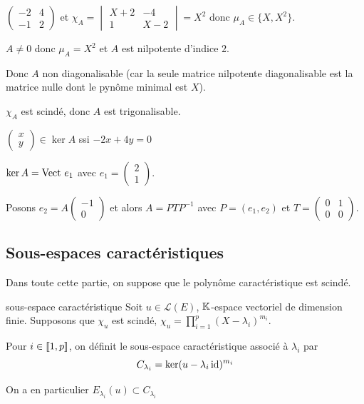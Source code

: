 \begin{exemple}
    $\begin{pmatrix}
        -2 & 4 \\ 
        -1 & 2
    \end{pmatrix}$ et $\chi_A = \begin{vmatrix}
        X + 2 & -4 \\
        1 & X - 2
    \end{vmatrix} = X^2$ donc $\mu_A \in \{X, X^2\}$.

    $A \neq 0$ donc $\mu_A = X^2$ et $A$ est nilpotente d'indice $2$.

    Donc $A$ non diagonalisable (car la seule matrice nilpotente diagonalisable 
    est la matrice nulle dont le pynôme minimal est $X$).

    $\chi_A$ est scindé, donc $A$ est trigonalisable. 

    $\begin{pmatrix}
        x \\ y
    \end{pmatrix} \in \ker A$ ssi $-2x + 4y = 0$

    $\ker A = \operatorname{Vect} \, e_1$ avec $e_1 = \begin{pmatrix}
        2 \\ 1
    \end{pmatrix}$.

    Posons $e_2 = A \begin{pmatrix}
        -1 \\ 0
    \end{pmatrix}$ et alors $A = PTP^{-1}$ avec $P = (e_1, e_2)$ et 
    $T = \begin{pmatrix}
        0 & 1 \\
        0 & 0
    \end{pmatrix}$.
\end{exemple}


\subsection{Sous-espaces caractéristiques}

Dans toute cette partie, on suppose que le polynôme caractéristique est scindé.

\begin{definition}{sous-espace caractéristique}{}
    Soit $u \in \mathscr L(E)$, $\mathbb{K}$-espace vectoriel de dimension finie. Supposons
    que $\chi_u$ est scindé, $\displaystyle \chi_u = \prod_{i = 1 }^{ p } (X - \lambda_i)^{m_i}$.

    \lvspace \avspace 

    Pour $i \in [\![1, p]\!]$, on définit le sous-espace caractéristique associé à $\lambda_i$ par 
    $$C_{\lambda_i} = \ker (u - \lambda_i \operatorname{id} )^{m_i}$$

    On a en particulier $E_{\lambda_i}(u) \subset C_{\lambda_i} $
\end{definition}


